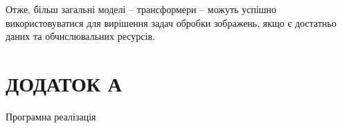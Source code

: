 \documentclass[a4paper,14pt]{extreport}
\begin{document}
Отже, більш загальні моделі -- трансформери -- можуть успішно
використовуватися для вирішення задач обробки зображень, якщо
є достатньо даних та обчислювальних ресурсів.

\newpage


\newpage
\chapter*{ДОДАТОК А}
\centerline{Програмна реалізація}
\vspace{\baselineskip}
\inputminted[breaklines,linenos=true]{python}{untitled0.py}


    

\end{document}

